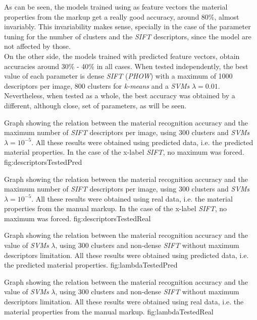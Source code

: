 As can be seen, the models trained using as feature vectors the material properties from the markup get a really good accuracy, around 80\%, almost invariably. This invariability makes sense, specially in the case of the parameter tuning for the number of clusters and the \emph{SIFT} descriptors, since the model are not affected by those. \\

On the other side, the models trained with predicted feature vectors, obtain accuracies around 30\% - 40\% in all cases. When tested independently, the best value of each parameter is  dense \emph{SIFT} (\emph{PHOW}) with a maximum of 1000 descriptors per image, 800 clusters for \emph{k-means} and a \emph{SVMs} $\lambda=0.01$. Nevertheless, when tested as a whole, the best accuracy was obtained by a different, although close, set of parameters, as will be seen.

{Graph showing the relation between the material recognition accuracy and the maximum number of \emph{SIFT} descriptors per image, using 300 clusters and \emph{SVMs} $\lambda=10^{-5}$. All these results were obtained using predicted data, i.e. the predicted material properties. In the case of the x-label \emph{SIFT}, no maximum was forced.}
{fig:descriptorsTestedPred}

{Graph showing the relation between the material recognition accuracy and the maximum number of \emph{SIFT} descriptors per image, using 300 clusters and \emph{SVMs} $\lambda=10^{-5}$. All these results were obtained using real data, i.e. the material properties from the manual markup. In the case of the x-label \emph{SIFT}, no maximum was forced.}
{fig:descriptorsTestedReal}

{Graph showing the relation between the material recognition accuracy and the value of \emph{SVMs} $\lambda$, using 300 clusters and non-dense \emph{SIFT} without maximum descriptors limitation. All these results were obtained using predicted data, i.e. the predicted material properties.}
{fig:lambdaTestedPred}

{Graph showing the relation between the material recognition accuracy and the value of \emph{SVMs} $\lambda$, using 300 clusters and non-dense \emph{SIFT} without maximum descriptors limitation. All these results were obtained using real data, i.e. the material properties from the manual markup.}
{fig:lambdaTestedReal}

